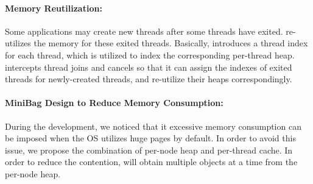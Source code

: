 \paragraph{Memory Reutilization:} Some applications may create new threads after some threads have exited. \NM{} re-utilizes the memory for these exited threads. Basically, \NM{} introduces a thread index for each thread, which is utilized to index the corresponding per-thread heap.  \NM{} intercepts thread joins and cancels so that it can assign the indexes of exited threads for newly-created threads, and re-utilize their heaps correspondingly.  


\paragraph{MiniBag Design to Reduce Memory Consumption:} During the development, we noticed that it excessive memory consumption  can be imposed when the OS utilizes huge pages by default. In order to avoid this issue, we propose the combination of per-node heap and per-thread cache. In order to reduce the contention, \NM{} will obtain multiple objects at a time from the per-node heap. 

 

